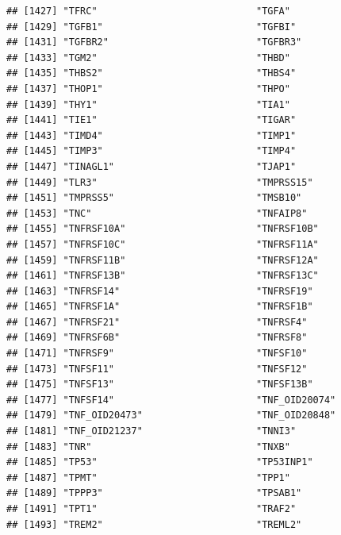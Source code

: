 \documentclass[
]{article}
\begin{document}
\begin{verbatim}
## [1427] "TFRC"                            "TGFA"                           
## [1429] "TGFB1"                           "TGFBI"                          
## [1431] "TGFBR2"                          "TGFBR3"                         
## [1433] "TGM2"                            "THBD"                           
## [1435] "THBS2"                           "THBS4"                          
## [1437] "THOP1"                           "THPO"                           
## [1439] "THY1"                            "TIA1"                           
## [1441] "TIE1"                            "TIGAR"                          
## [1443] "TIMD4"                           "TIMP1"                          
## [1445] "TIMP3"                           "TIMP4"                          
## [1447] "TINAGL1"                         "TJAP1"                          
## [1449] "TLR3"                            "TMPRSS15"                       
## [1451] "TMPRSS5"                         "TMSB10"                         
## [1453] "TNC"                             "TNFAIP8"                        
## [1455] "TNFRSF10A"                       "TNFRSF10B"                      
## [1457] "TNFRSF10C"                       "TNFRSF11A"                      
## [1459] "TNFRSF11B"                       "TNFRSF12A"                      
## [1461] "TNFRSF13B"                       "TNFRSF13C"                      
## [1463] "TNFRSF14"                        "TNFRSF19"                       
## [1465] "TNFRSF1A"                        "TNFRSF1B"                       
## [1467] "TNFRSF21"                        "TNFRSF4"                        
## [1469] "TNFRSF6B"                        "TNFRSF8"                        
## [1471] "TNFRSF9"                         "TNFSF10"                        
## [1473] "TNFSF11"                         "TNFSF12"                        
## [1475] "TNFSF13"                         "TNFSF13B"                       
## [1477] "TNFSF14"                         "TNF_OID20074"                   
## [1479] "TNF_OID20473"                    "TNF_OID20848"                   
## [1481] "TNF_OID21237"                    "TNNI3"                          
## [1483] "TNR"                             "TNXB"                           
## [1485] "TP53"                            "TP53INP1"                       
## [1487] "TPMT"                            "TPP1"                           
## [1489] "TPPP3"                           "TPSAB1"                         
## [1491] "TPT1"                            "TRAF2"                          
## [1493] "TREM2"                           "TREML2"                         

\end{verbatim}
\end{document}
